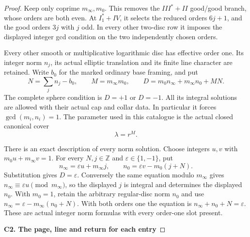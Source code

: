 \begin{proof}
Keep only coprime \(m_\infty,m_0\). This removes the
\(III^*+II\) good/good branch, whose orders are both even.
At \(I_1^*+IV\), it selects the reduced orders \(6j+1\),
and the good orders \(3j\) with \(j\) odd. In every other
two-disc row it imposes the displayed integer gcd condition
on the two independently chosen orders.

Every other smooth or multiplicative logarithmic disc has
effective order one. Its integer norm \(n_j\), its actual
elliptic translation and its finite line character are
retained. Write \(b_0\) for the marked ordinary base framing,
and put
\[
 N=\sum_j n_j-b_0,\qquad
 M=m_\infty m_0,\qquad
 D=m_0n_\infty+m_\infty n_0+MN.                 \tag{SC.1}
\]
The complete sphere condition is \(D=+1\) or \(D=-1\).
All its integral solutions are allowed with their actual
cap and collar data. In particular it forces
\(\gcd(m_i,n_i)=1\). The parameter used in this catalogue is
the actual closed canonical cover
\[
                         \lambda=r^M.          \tag{SC.2}
\]

There is an exact description of every norm solution. Choose
integers \(u,v\) with \(m_0u+m_\infty v=1\). For every
\(N,j\in\mathbb Z\) and \(\varepsilon\in\{1,-1\}\), put
\[
 n_\infty=\varepsilon u+m_\infty j,\qquad
 n_0=\varepsilon v-m_0(j+N).
\]
Substitution gives \(D=\varepsilon\). Conversely the same
equation modulo \(m_\infty\) gives
\(n_\infty\equiv\varepsilon u\pmod {m_\infty}\), so the
displayed \(j\) is integral and determines the displayed
\(n_0\). With \(m_0=1\), retain the arbitrary regular-disc
norm \(n_0\) and use
\(n_\infty=\varepsilon-m_\infty(n_0+N)\).
With both orders one the equation is
\(n_\infty+n_0+N=\varepsilon\).
These are actual integer norm formulas with every
order-one slot present.

\par

\medskip\noindent\textbf{C2. The page, line and return for each entry}

\par\nobreak


\end{proof}
